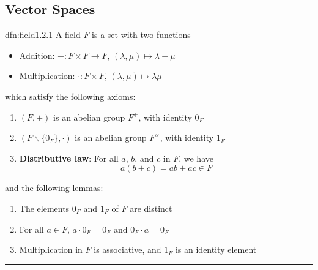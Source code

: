 \documentclass[landscape, 8pt]{extarticle}
\begin{document}
\setlength{\abovedisplayskip}{3.5pt}
\setlength{\belowdisplayskip}{3.5pt}
\setlength{\abovedisplayshortskip}{3.5pt}
\setlength{\belowdisplayshortskip}{3.5pt}

\begin{multicols}{3}
\raggedcolumns

\section{Vector Spaces}

\begin{dfn}{dfn:field}{1.2.1}
    A {field} $F$ is a set with two functions
    \begin{itemize}
        \setlength\itemsep{0em}
        \item Addition: $+ : F \times F \to F,\,(\lambda, \mu) \mapsto \lambda + \mu$
        \item Multiplication: $\cdot : F \times F,\, (\lambda, \mu) \mapsto \lambda\mu$
    \end{itemize}
    which satisfy the following axioms:
    \begin{enumerate}
        \setlength\itemsep{0em}
        \item $(F, +)$ is an abelian group $F^{+}$, with identity $0_{F}$
        \item $(F\backslash \{0_{F}\}, \cdot)$ is an abelian group $F^{\times}$, with identity $1_{F}$
        \item \textbf{Distributive law}: For all $a$, $b$, and $c$ in $F$, we have
            \[a(b + c) = ab + ac \in F\]
    \end{enumerate}

    \vspace{-5pt}
    and the following lemmas:
    \begin{enumerate}
        \setlength\itemsep{0em}
        \item The elements $0_{F}$ and $1_{F}$ of $F$ are distinct
        \item For all $a\in F$, $a \cdot 0_{F} = 0_{F} $ and $0_{F} \cdot a = 0_{F}$
        \item Multiplication in $F$ is associative, and $1_{F}$ is an identity element
    \end{enumerate}

    \vspace{-5pt}
    \noindent\rule{\textwidth}{0.2pt}


\end{dfn}
\end{multicols}
\end{document}
